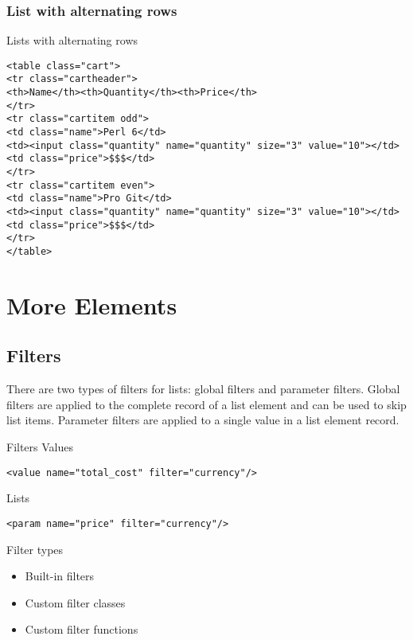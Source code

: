 \subsubsection{List with alternating rows}
\begin{frame}[fragile]{Lists with alternating rows}
\begin{lstlisting}
<table class="cart">
<tr class="cartheader">
<th>Name</th><th>Quantity</th><th>Price</th>
</tr>
<tr class="cartitem odd">
<td class="name">Perl 6</td>
<td><input class="quantity" name="quantity" size="3" value="10"></td>
<td class="price">$$$</td>
</tr>
<tr class="cartitem even">
<td class="name">Pro Git</td>
<td><input class="quantity" name="quantity" size="3" value="10"></td>
<td class="price">$$$</td>
</tr>
</table>
\end{lstlisting}
\end{frame}

\section{More Elements}
\subsection{Filters}
There are two types of filters for lists: global filters and
parameter filters. Global filters are applied to the complete
record of a list element and can be used to skip list items.
Parameter filters are applied to a single value in a list
element record.

\begin{frame}[fragile]{Filters}
Values
\begin{lstlisting}
<value name="total_cost" filter="currency"/>
\end{lstlisting}
Lists
\begin{lstlisting}
<param name="price" filter="currency"/>
\end{lstlisting}

\end{frame}

\begin{frame}{Filter types}
\begin{itemize}
\item{Built-in filters}
\item{Custom filter classes}
\item{Custom filter functions}
\end{itemize}
\end{frame}

